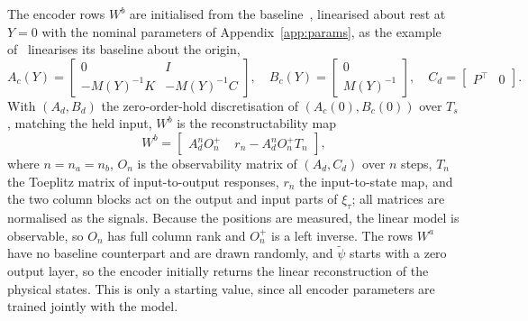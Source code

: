The encoder rows $W^b$ are initialised from the
baseline~\cite[Sec.~3.1]{hoekstra2026encoder}, linearised about rest at
$Y=0$ with the nominal parameters of Appendix~\ref{app:params}, as the
example of~\cite[Sec.~4.2]{hoekstra2026encoder} linearises its baseline
about the origin,
\begin{equation}
 A_c(Y)=\begin{bmatrix}0 & I\\ -M(Y)^{-1}K & -M(Y)^{-1}C\end{bmatrix},\quad
 B_c(Y)=\begin{bmatrix}0\\ M(Y)^{-1}\end{bmatrix},\quad
 C_d=\begin{bmatrix}P^\top & 0\end{bmatrix}.
 \label{eq:aug_lin}
\end{equation}
With $(A_d,B_d)$ the zero-order-hold discretisation of $(A_c(0),B_c(0))$
over $T_s$, matching the held input, $W^b$ is the reconstructability
map~\cite[Eqs.~(16), (17)]{hoekstra2026encoder}
\begin{equation}
 W^b=\begin{bmatrix}
  A_d^nO_n^{+} & \;r_n-A_d^nO_n^{+}T_n
 \end{bmatrix},
 \label{eq:aug_wb}
\end{equation}
where $n=n_a=n_b$, $O_n$ is the observability matrix of $(A_d,C_d)$ over $n$
steps, $T_n$ the Toeplitz matrix of input-to-output responses, $r_n$ the
input-to-state map, and the two column blocks act on the output and input
parts of $\xi_\tau$; all matrices are normalised as the signals.
Because the positions are measured, the linear model is observable, so $O_n$
has full column rank and $O_n^{+}$ is a left inverse.
The rows $W^a$ have no baseline counterpart and are drawn randomly, and
$\tilde\psi$ starts with a zero output layer, so the encoder initially
returns the linear reconstruction of the physical states.
This is only a starting value, since all encoder parameters are trained
jointly with the model.
